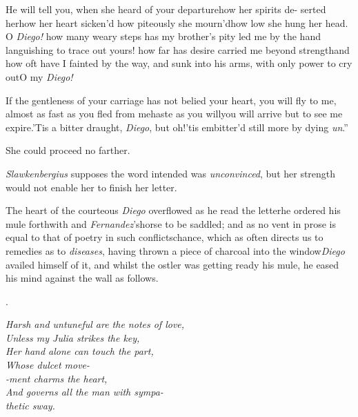\documentclass{article}
\begin{document}
\indent\lqq He will tell you, when she heard\break
\lqq of your departure\tsk how her spirits de-\break
\lqq serted her\tsk how her heart sicken’d\tsk\break
\lqq how piteously she mourn’d\tsh how low\break
\lqq she hung her head. O \textit{Diego!} how\break
\lqq many weary steps has my brother’s\break
\lqq pity led me by the hand languishing\break
\lqq to trace out yours! how far has desire\break
\lqq carried me beyond strength\tsh and how\pb
\lqq oft have I fainted by the way, and\break
\lqq sunk into his arms, with only power\break
\lqq to cry out\tsk O my \textit{Diego!}

\indent\lqq If the gentleness of your carriage\break
\lqq has not belied your heart, you will fly\break
\lqq to me, almost as fast as you fled from\break
\lqq me\tsk haste as you will\tsh you will arrive\break
\lqq but to see me expire.\tsk ’Tis a bitter\break
\lqq draught, \textit{Diego}, but oh!\@ ’tis embitter’d\break
\lqq still more by dying \textit{un}\tsh.”

She could proceed no farther.

\textit{Slawkenbergius} supposes the word intended was
\textit{unconvinced}, but her strength would not enable her to finish her
letter.

The heart of the courteous \textit{Diego} overflowed as he read
the letter\tsk he ordered his mule forthwith and
\textit{Fernandez}’s\pb horse
to be saddled; and as no vent in
prose is equal to that of poetry in such
conflicts\tsk chance, which as often directs us to
remedies as to \textit{diseases}, having thrown a piece of charcoal
into the window\tsh \textit{Diego} availed himself of it,
and whilst the ostler was getting ready his mule, he eased his
mind against the wall as follows.

\bigskip
\centerline{.}
\parskip
\bgroup\itshape\small\noindent
\null\quad Harsh and untuneful are the notes of love,\\
\null\qquad Unless my Julia strikes the key,\\
\null\quad Her hand alone can touch the part,\\
\null\qquad Whose dulcet move-\\
\null\quad -ment charms the heart,\\
\null\qquad And governs all the man with sympa-\\
\null\qquad\quad thetic sway.
\par\egroup
\end{document}
